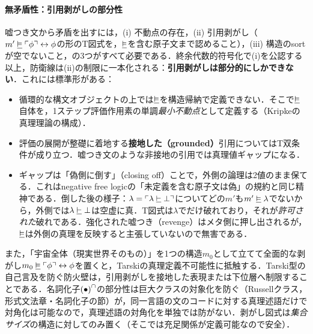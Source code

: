 \documentclass[../../main-detail.tex]{subfiles}
\begin{document}
\paragraph{無矛盾性：引用剥がしの部分性}
嘘つき文から矛盾を出すには，(i) 不動点の存在，(ii) 引用剥がし（$m' \mathrel{\underline{\vDash}} \ulcorner \phi \urcorner \leftrightarrow \phi$の形のT図式を，$\mathrel{\underline{\vDash}}$を含む原子文まで認めること），(iii) 構造のsortが空でないこと，の3つがすべて必要である．終余代数的符号化で(i)を公認する以上，防衛線は(ii)の制限に一本化される：\textbf{引用剥がしは部分的にしかできない}．これには標準形がある：
\begin{itemize}
    \item 循環的な構文オブジェクトの上では$\mathrel{\underline{\vDash}}$を構造帰納で定義できない．そこで$\mathrel{\underline{\vDash}}$自体を，1ステップ評価作用素の単調\emph{最小不動点}として定義する（Kripkeの真理理論の構成）．
    \item 評価の展開が整礎に着地する\textbf{接地した（grounded）}引用についてはT双条件が成り立つ．嘘つき文のような非接地の引用では真理値ギャップになる．
    \item ギャップは「偽側に倒す」（closing off）ことで，外側の論理は2値のまま保てる．これはnegative free logicの「未定義を含む原子文は偽」の規約と同じ精神である．倒した後の様子：$\lambda = \ulcorner \lambda \mathrel{\underline{\vdash}} \bot \urcorner$についてどの$m'$も$m' \mathrel{\underline{\vDash}} \lambda$でないから，外側では$\lambda \mathrel{\underline{\vdash}} \bot$は空虚に真．T図式は$\lambda$でだけ破れており，それが\emph{許可された}破れである．強化された嘘つき（revenge）はメタ側に押し出されるが，$\mathrel{\underline{\vDash}}$は外側の真理を反映すると主張していないので無害である．
\end{itemize}
また，「宇宙全体（現実世界そのもの）」を1つの構造$m_0$として立てて全面的な剥がし$m_0 \mathrel{\underline{\vDash}} \ulcorner \phi \urcorner \leftrightarrow \phi$を置くと，Tarskiの真理定義不可能性に抵触する．Tarski型の自己言及を防ぐ防火壁は，引用剥がしを接地した表現または下位層へ制限することである．名詞化子${{(\bullet)}^\cap}$の部分性は巨大クラスの対象化を防ぐ（Russellクラス，形式文法章・名詞化子の節）が，同一言語の文のコードに対する真理述語だけで対角化は可能なので，真理述語の対角化を単独では防がない．剥がし図式は\emph{集合サイズ}の構造に対してのみ置く（そこでは充足関係が定義可能なので安全）．
\end{document}
